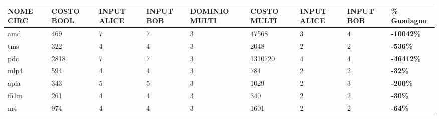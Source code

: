 \documentclass[
]{book}
\begin{document}
\begin{table}
\centering
\begin{tabular}{|l|l|l|l|l|l|l|l|l|} 
\hline
\textbf{ NOME CIRC } & \textbf{COSTO BOOL }                                    & \textbf{INPUT ALICE } & \textbf{INPUT BOB } & \textbf{DOMINIO MULTI } & \textbf{COSTO MULTI }                                    & \textbf{INPUT ALICE } & \textbf{INPUT BOB } & \% Guadagno            \\ 
\hline
amd                  & 469                                                     & 7                     & 7                   & 3                       & 47568                                                    & 3                     & 4                   & \textbf{-10042\% }     \\ 
\hline
tms                  & 322                                                     & 4                     & 4                   & 3                       & 2048                                                     & 2                     & 2                   & \textbf{-536\% }       \\ 
\hline
pdc                  & 2818                                                    & 7                     & 7                   & 3                       & 1310720                                                  & 4                     & 4                   & \textbf{-46412\% }     \\ 
\hline
mlp4                 & 594                                                     & 4                     & 4                   & 3                       & 784                                                      & 2                     & 2                   & \textbf{-32\% }        \\ 
\hline
apla                 & 343                                                     & 5                     & 5                   & 3                       & 1029                                                     & 2                     & 3                   & \textbf{-200\% }       \\ 
\hline
f51m                 & 261                                                     & 4                     & 4                   & 3                       & 340                                                      & 2                     & 2                   & \textbf{-30\% }        \\ 
\hline
m4                   & 974                                                     & 4                     & 4                   & 3                       & 1601                                                     & 2                     & 2                   & \textbf{-64\% }        \\ 

\end{tabular}
\end{table}
\end{document}
